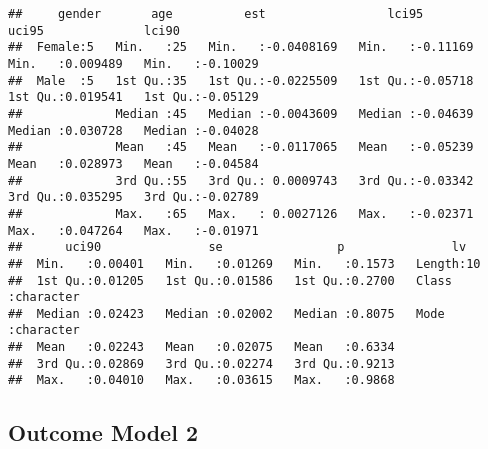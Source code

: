 \documentclass[
]{article}
\begin{document}
\begin{verbatim}
##     gender       age          est                 lci95              uci95              lci90         
##  Female:5   Min.   :25   Min.   :-0.0408169   Min.   :-0.11169   Min.   :0.009489   Min.   :-0.10029  
##  Male  :5   1st Qu.:35   1st Qu.:-0.0225509   1st Qu.:-0.05718   1st Qu.:0.019541   1st Qu.:-0.05129  
##             Median :45   Median :-0.0043609   Median :-0.04639   Median :0.030728   Median :-0.04028  
##             Mean   :45   Mean   :-0.0117065   Mean   :-0.05239   Mean   :0.028973   Mean   :-0.04584  
##             3rd Qu.:55   3rd Qu.: 0.0009743   3rd Qu.:-0.03342   3rd Qu.:0.035295   3rd Qu.:-0.02789  
##             Max.   :65   Max.   : 0.0027126   Max.   :-0.02371   Max.   :0.047264   Max.   :-0.01971  
##      uci90               se                p               lv           
##  Min.   :0.00401   Min.   :0.01269   Min.   :0.1573   Length:10         
##  1st Qu.:0.01205   1st Qu.:0.01586   1st Qu.:0.2700   Class :character  
##  Median :0.02423   Median :0.02002   Median :0.8075   Mode  :character  
##  Mean   :0.02243   Mean   :0.02075   Mean   :0.6334                     
##  3rd Qu.:0.02869   3rd Qu.:0.02274   3rd Qu.:0.9213                     
##  Max.   :0.04010   Max.   :0.03615   Max.   :0.9868
\end{verbatim}

\hypertarget{outcome-model-2-1}{%
\subsection{Outcome Model 2}\label{outcome-model-2-1}}
\end{document}
